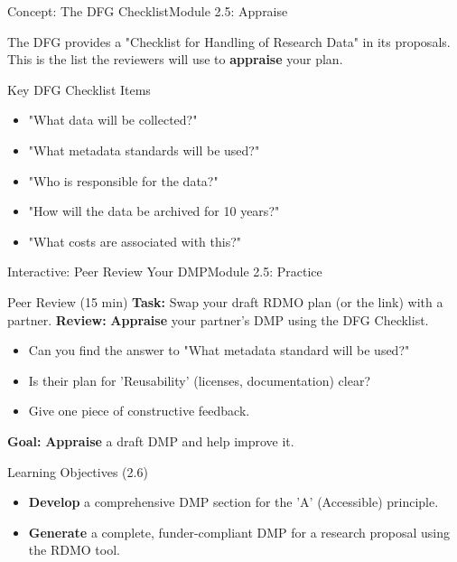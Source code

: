 \begin{frame}{Concept: The DFG Checklist}{Module 2.5: Appraise}
    
    The DFG provides a "Checklist for Handling of Research Data" in its proposals. This is the list the reviewers will use to \textbf{appraise} your plan.
    \pause
    \begin{block}{Key DFG Checklist Items}
        \begin{itemize}
            \item "What data will be collected?"
            \item "What metadata standards will be used?"
            \item "Who is responsible for the data?"
            \item "How will the data be archived for 10 years?"
            \item "What costs are associated with this?"
        \end{itemize}
    \end{block}
\end{frame}

\begin{frame}{Interactive: Peer Review Your DMP}{Module 2.5: Practice}
    \begin{block}{Peer Review (15 min)}
        \textbf{Task:} Swap your draft RDMO plan (or the link) with a partner.
        \pause
        \textbf{Review:} \textbf{Appraise} your partner's DMP using the DFG Checklist.
        \pause
        \begin{itemize}
            \item Can you find the answer to "What metadata standard will be used?"
            \item Is their plan for 'Reusability' (licenses, documentation) clear?
            \item Give one piece of constructive feedback.
        \end{itemize}
        \pause
        \textbf{Goal:} \textbf{Appraise} a draft DMP and help improve it.
    \end{block}
\end{frame}

\begin{frame}{Learning Objectives (2.6)}
    \begin{itemize}
        \item \textbf{Develop} a comprehensive DMP section for the 'A' (Accessible) principle.
        \item \textbf{Generate} a complete, funder-compliant DMP for a research proposal using the RDMO tool.
    \end{itemize}
\end{frame}

